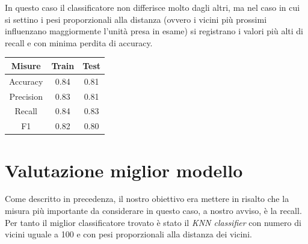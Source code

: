 In questo caso il classificatore non differisce molto dagli altri,
ma nel caso in cui si settino i pesi proporzionali alla distanza
(ovvero i vicini pi\`u prossimi influenzano maggiormente l'unit\`a
presa in esame) si registrano i valori pi\`u alti di recall e con
minima perdita di accuracy.

\begin{center}
	\begin{tabular}{c|c|c}
		\hline
		\textbf{Misure} & \textbf{Train} & \textbf{Test}\\
		\hline
		Accuracy & 0.84 & 0.81\\
		\hline
		Precision & 0.83 & 0.81\\
		\hline
		Recall & 0.84 & 0.83\\
		\hline
		F1 & 0.82 & 0.80\\
		\hline
	\end{tabular}
\end{center}

\section{Valutazione miglior modello}
Come descritto in precedenza, il nostro obiettivo era mettere in
risalto che la misura pi\`u importante da considerare
in questo caso, a nostro avviso, \`e la recall.
Per tanto il miglior classificatore trovato \`e stato il
\textit{KNN classifier} con numero di vicini uguale a 100
e con pesi proporzionali alla distanza dei vicini.
